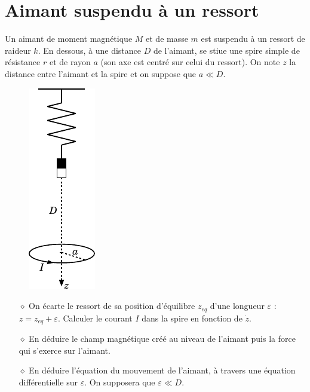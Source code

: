 \documentclass{report}
\begin{document}
\section*{Aimant suspendu à un ressort}

Un aimant de moment magnétique $M$ et de masse $m$ est suspendu à un ressort de raideur $k$. En dessous, à une distance $D$ de l'aimant, se stiue une spire simple de résistance $r$ et de rayon $a$ (son axe est centré sur celui du ressort). On note $z$ la distance entre l'aimant et la spire et on suppose que $a\ll D$.

\begin{figure}[h!]
\centering
		\includegraphics[scale=1.2]{induction3.pdf}
\end{figure}

\begin{itemize}

	\item[$\diamond$] On écarte le ressort de sa position d'équilibre $z_{eq}$ d'une longueur $\varepsilon$ : $z=z_{eq}+\varepsilon$. Calculer le courant $I$ dans la spire en fonction de $\dot{z}$. 
	
	\item[$\diamond$] En déduire le champ magnétique créé au niveau de l'aimant puis la force qui s'exerce sur l'aimant.
	
	\item[$\diamond$] En déduire l'équation du mouvement de l'aimant, à travers une équation différentielle sur $\varepsilon$. On supposera que $\varepsilon\ll D$.

\end{itemize}

\newpage
\end{document}
